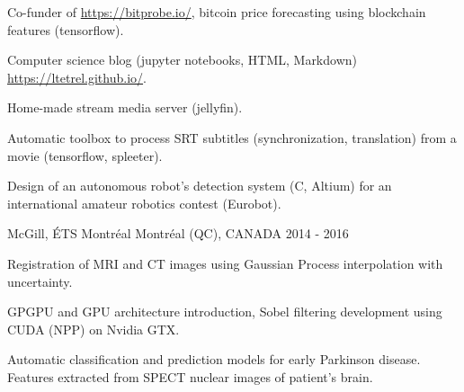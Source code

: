 


\begin{cventries}


\cventry
{} %
{} %
{} %
{} %
{ %
\vspace{-5mm}
\begin{cvitems}
\item {Co-funder of \url{https://bitprobe.io/}, bitcoin price forecasting using blockchain features (tensorflow).}
\item {Computer science blog (jupyter notebooks, HTML, Markdown) \url{https://ltetrel.github.io/}.}
\item {Home-made stream media server (jellyfin).}
\item {Automatic toolbox to process SRT subtitles (synchronization, translation) from a movie (tensorflow, spleeter).}
\item{Design of an autonomous robot's detection system (C, Altium) for an international amateur robotics contest (Eurobot).}
\end{cvitems}
}


\cventry
{} %
{McGill, ÉTS Montréal} %
{\hspace{-5mm}Montréal (QC), CANADA} %
{2014 - 2016} %
{ %
\vspace{-5mm}
\begin{cvitems}
\item {Registration of MRI and CT images using Gaussian Process interpolation with uncertainty.}
\item {GPGPU and GPU architecture introduction, Sobel filtering development using CUDA (NPP) on Nvidia GTX.}
\item {Automatic classification and prediction models for early Parkinson disease. Features extracted from SPECT nuclear images of patient's brain.}
\end{cvitems}
}


\end{cventries}
